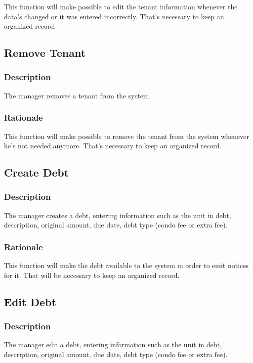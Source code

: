 \documentclass{scrreprt}
\begin{document}
This function will make possible to edit the tenant information whenever the data's changed or it was entered incorrectly. That's necessary to keep an organized record.

\subsection{Remove Tenant}
\subsubsection{Description}

The manager removes a tenant from the system.

\subsubsection{Rationale}

This function will make possible to remove the tenant from the system whenever he's not needed anymore. That's necessary to keep an organized record.

\subsection{Create Debt}
\subsubsection{Description}

The manager creates a debt, entering information such as the unit in debt, description, original amount, due date, debt type (condo fee or extra fee).

\subsubsection{Rationale}

This function will make the debt available to the system in order to emit notices for it. That will be necessary to keep an organized record.

\subsection{Edit Debt}
\subsubsection{Description}

The manager edit a debt, entering information such as the unit in debt, description, original amount, due date, debt type (condo fee or extra fee).
\end{document}
